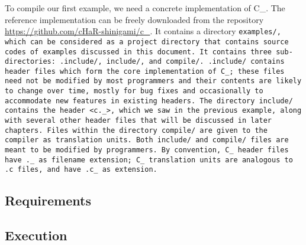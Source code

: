 \def\Subsection#1{\subsection{#1}}

To compile our first example, we need a concrete implementation of C\_.
The reference implementation can be freely downloaded from the repository
\url{https://github.com/cHaR-shinigami/c_}.
It contains a directory \tt{examples/}, which can be considered as a project
directory that contains source codes of examples discussed in this document.
It contains three sub-directories:
\tt{.include/}, \tt{include/}, and \tt{compile/}.
\tt{.include/} contains header files which form the core implementation of C\_;
these files need not be modified by most programmers and their
contents are likely to change over time, mostly for bug fixes
and occasionally to accommodate new features in existing headers.
The directory \tt{include/} contains the header \tt{<c._>},
which we saw in the previous example, along with several
other header files that will be discussed in later chapters.
Files within the directory \tt{compile/} are
given to the compiler as translation units.
Both \tt{include/} and \tt{compile/} files
are meant to be modified by programmers.
By convention, C\_ header files have \tt{._} as filename extension;
C\_ translation units are analogous to \tt{.c} files,
and have \tt{.c_} as extension.

\Subsection{Requirements}

\Subsection{Execution}
